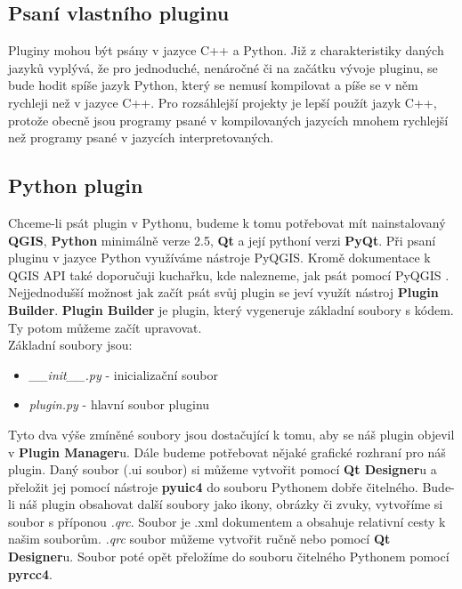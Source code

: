 \subsection{Psaní vlastního pluginu}
Pluginy mohou být psány v jazyce C++ a Python. Již z charakteristiky daných jazyků vyplývá, že pro jednoduché, nenáročné či na začátku vývoje pluginu, se bude hodit spíše jazyk Python, který se nemusí kompilovat a píše se v něm rychleji než v jazyce C++. Pro rozsáhlejší projekty je lepší použít jazyk C++, protože obecně jsou programy psané v kompilovaných jazycích mnohem rychlejší než programy psané v jazycích interpretovaných. 

\subsection{Python plugin}
\nocite{pyqgis:www}
Chceme-li psát plugin v Pythonu, budeme k tomu potřebovat mít nainstalovaný \textbf{QGIS}, \textbf{Python} minimálně verze 2.5, \textbf{Qt} a její pythoní verzi \textbf{PyQt}. Při psaní pluginu v jazyce Python využíváme nástroje PyQGIS. Kromě dokumentace k QGIS API \cite{qgis_api:www} také doporučuji kuchařku, kde nalezneme, jak psát pomocí PyQGIS \cite{pyqgis:www}. Nejjednodušší možnost jak začít psát svůj plugin se jeví využít nástroj \textbf{Plugin Builder}. \textbf{Plugin Builder} je plugin, který vygeneruje základní soubory s kódem. Ty potom můžeme začít upravovat. \\

\noindent Základní soubory jsou:
\begin{itemize}
	\item \textit{\_\_init\_\_.py} - inicializační soubor
	\item \textit{plugin.py} - hlavní soubor pluginu
\end{itemize}

Tyto dva výše zmíněné soubory jsou dostačující k tomu, aby se náš plugin objevil v \textbf{Plugin Manager}u. Dále budeme potřebovat nějaké grafické rozhraní pro náš plugin. Daný soubor (.ui soubor) si můžeme vytvořit pomocí \textbf{Qt Designer}u a přeložit jej pomocí nástroje  \textbf{pyuic4} do souboru Pythonem dobře čitelného. Bude-li náš plugin obsahovat další soubory jako ikony, obrázky či zvuky, vytvoříme si soubor s příponou \textit{.qrc}. Soubor je .xml dokumentem a obsahuje relativní cesty k našim souborům. \textit{.qrc} soubor můžeme vytvořit ručně nebo pomocí \textbf{Qt Designer}u. Soubor poté opět přeložíme do souboru čitelného Pythonem pomocí  \textbf{pyrcc4}.

